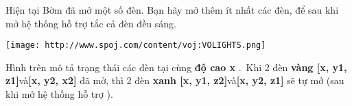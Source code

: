 Hiện tại Bờm đã mở một số đèn. Bạn hãy mở thêm ít nhất các đèn, để sau khi mở hệ thống hỗ trợ tắc cả đèn đều sáng.


\texttt{[image: http://www.spoj.com/content/voj:VOLIGHTS.png]}

Hình trên mô tả trạng thái các đèn tại cùng \textbf{độ cao x} . Khi 2 đèn \textbf{vàng [x, y1, z1]}và\textbf{[x, y2, x2]} đã mở, thì 2 đèn \textbf{xanh [x, y1, z2]}và\textbf{[x, y2, z1]} sẽ tự mở (sau khi mở hệ thống hỗ trợ ).